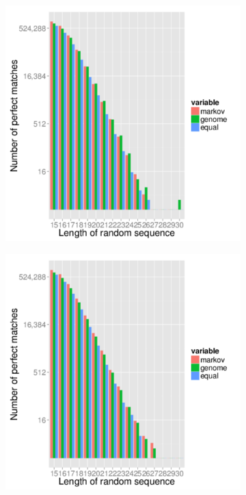 \documentclass{article}
\begin{document}
\begin{figure}
   \centering
   \begin{subfigure}{.5\textwidth}
      \centering
      \includegraphics[width=.9\textwidth,natwidth=100,natheight=100]{hg38_perfect_mapped_1000000.pdf}
      \caption{}
      \label{fig:hg38_mapped_perfect}
   \end{subfigure}%
   \begin{subfigure}{.5\textwidth}
      \centering
      \includegraphics[width=.9\textwidth,natwidth=100,natheight=100]{mm10_perfect_mapped_1000000.pdf}

\end{subfigure}
\end{figure}
\end{document}

